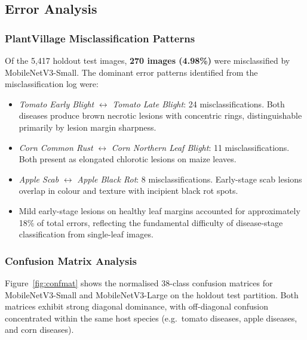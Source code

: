\documentclass[pdflatex,sn-mathphys-num]{sn-jnl}
\begin{document}
\subsection{Error Analysis}
\label{sec:error_analysis}

\subsubsection{PlantVillage Misclassification Patterns}

Of the 5{,}417 holdout test images, \textbf{270 images (4.98\%)} were misclassified
by MobileNetV3-Small. The dominant error patterns identified from the misclassification
log were:
\begin{itemize}
  \item \textit{Tomato Early Blight} $\leftrightarrow$ \textit{Tomato Late Blight}:
        24 misclassifications. Both diseases produce brown necrotic lesions with
        concentric rings, distinguishable primarily by lesion margin sharpness.
  \item \textit{Corn Common Rust} $\leftrightarrow$ \textit{Corn Northern Leaf Blight}:
        11 misclassifications. Both present as elongated chlorotic lesions on maize leaves.
  \item \textit{Apple Scab} $\leftrightarrow$ \textit{Apple Black Rot}:
        8 misclassifications. Early-stage scab lesions overlap in colour and texture
        with incipient black rot spots.
  \item Mild early-stage lesions on healthy leaf margins accounted for approximately
        18\% of total errors, reflecting the fundamental difficulty of disease-stage
        classification from single-leaf images.
\end{itemize}

\subsubsection{Confusion Matrix Analysis}

Figure~\ref{fig:confmat} shows the normalised 38-class confusion matrices for
MobileNetV3-Small and MobileNetV3-Large on the holdout test partition. Both matrices
exhibit strong diagonal dominance, with off-diagonal confusion concentrated within
the same host species (e.g.\ tomato diseases, apple diseases, and corn diseases).
\end{document}
